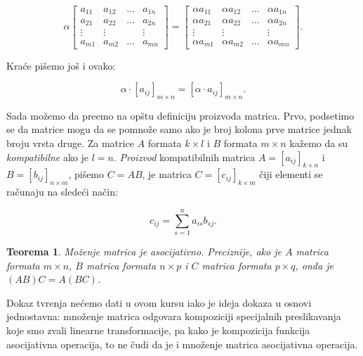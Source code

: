 \documentclass[11pt]{article}
\theoremstyle{masulthm}
\newtheorem{theorem}{Teorema}[section]
\theoremstyle{masuldef}
\theoremstyle{masulexmp}
\begin{document}
\begin{equation*}
    \alpha
    \begin{bmatrix}
        a_{11} & a_{12} & \dots & a_{1n} \\
        a_{21} & a_{22} & \dots & a_{2n} \\
        \vdots & \vdots &       & \vdots \\
        a_{m1} & a_{m2} & \dots & a_{mn}
    \end{bmatrix}
    =
    \begin{bmatrix}
        \alpha a_{11} & \alpha a_{12} & \dots & \alpha a_{1n} \\
        \alpha a_{21} & \alpha a_{22} & \dots & \alpha a_{2n} \\
        \vdots & \vdots &       & \vdots \\
        \alpha a_{m1} & \alpha a_{m2} & \dots & \alpha a_{mn}
    \end{bmatrix}.
\end{equation*}

\noindent
Kraće pišemo još i ovako:

\begin{equation*}
    \alpha \cdot [a_{ij}]_{m \times n} = [\alpha \cdot a_{ij}]_{m \times n}.
\end{equation*}

Sada možemo da pre\dj emo na opštu definiciju proizvoda matrica. Prvo, podsetimo se da 
matrice mogu da se pomnože samo ako je broj kolona prve matrice jednak broju vrsta druge.
Za matrice $ A $ formata $ k \times l $ i $ B $ formata $ m \times n $ kažemo
da su \emph{kompatibilne} ako je $ l = n $. \emph{Proizvod} kompatibilnih
matrica $ A = [a_{ij}]_{k \times n} $ i $ B = [b_{ij}]_{n \times m} $, pišemo $ C = AB $, je
matrica $ C = [c_{ij}]_{k \times m} $ čiji elementi se računaju na
sledeći način:

\begin{equation*}
    c_{ij} = \sum_{s = 1}^n a_{is} b_{sj}.
\end{equation*}

\begin{theorem}
    Moženje matrica je asocijativno. Preciznije, ako je $ A $ matrica formata $ m \times n $,
    $ B $ matrica formata $ n \times p $ i $ C $ matrica formata
    $ p \times q $, onda je $ (AB)C = A(BC) $.
\end{theorem}

Dokaz tvr\dj enja nećemo dati u ovom kursu iako je ideja dokaza u osnovi jednostavna: množenje matrica
odgovara kompoziciji specijalnih preslikavanja koje smo zvali linearne transformacije, pa kako je
kompozicija funkcija asocijativna operacija, to ne čudi da je i množenje matrica asocijativna operacija.
\end{document}

